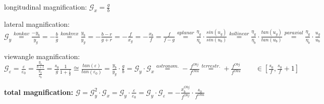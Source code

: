 \vspace{5ex}
longitudinal magnification:
\vspace{2ex} \newline
$
\mathscr{G}_x = \frac{g}{b}
$


\vspace{5ex}
lateral magnification:
\vspace{2ex} \newline
$
\mathscr{G}_y 
\stackrel{konkav}{=}
\frac{-y_b}{y_g} = 
- \frac{b}{g} 
\stackrel{konkvex}{=}
\frac{y_b}{y_g} = 
- \frac{b-r}{g+r}  = 
- \frac{f}{x_g} = 
- \frac{x_b}{f} = 
\frac{f}{f-g}
\stackrel{aplanar}{=}
\frac{\eta_g}{\eta_b} \cdot \frac{sin(u_g)}{sin(u_b)} 
\stackrel{kollinear}{=}
\frac{\eta_g}{\eta_b} \cdot \frac{tan(u_g)}{tan(u_b)} 
\stackrel{paraxial}{=}
\frac{\eta_g}{\eta_b} \cdot \frac{u_g}{u_b} 
$


\vspace{5ex}
viewangle magnification:
\vspace{2ex} \newline
$
\mathscr{G}_\varepsilon =
\frac{\varepsilon}{\varepsilon_0} =
\frac{\frac{y_b}{b+l}}{\frac{y_g}{s_0}} =
\frac{s_0}{g} \frac{1}{1+\frac{l}{b}} \cong
\frac{tan(\varepsilon)}{tan(\varepsilon_0)} =
\frac{y_b}{y_g} \cdot \frac{g}{b} = 
\mathscr{G}_y \cdot \mathscr{G}_x
\stackrel{astronom.}{=}
- \frac{f^{Obj}}{f^{Oku}}
\stackrel{terrestr.}{=}
+ \frac{f^{Obj}}{f^{Oku}}
\qquad
\in \left[ \frac{s_0}{f} , \frac{s_0}{f}+1 \right]
$


\vspace{5ex}
\textbf{total magnification:}
\vspace{2ex} \newline
$
\mathscr{G} = 
\mathscr{G}_y^2  \cdot \mathscr{G}_x = 
\mathscr{G}_y \cdot \frac{\varepsilon}{\varepsilon_0} = 
\mathscr{G}_y \cdot \mathscr{G}_\varepsilon = 
-\frac{x_b^{Obj}}{f^{Obj}} \cdot \frac{s_0}{f^{Oku}}
$
\vspace{8ex}

